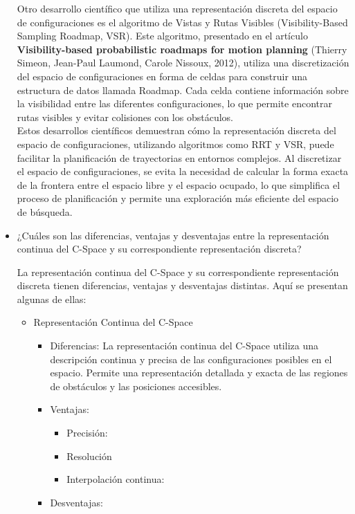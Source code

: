 \documentclass{article}
\begin{document}
\begin{itemize}
  Otro desarrollo científico que utiliza una representación discreta del espacio de configuraciones es el algoritmo de Vistas y Rutas Visibles (Visibility-Based Sampling Roadmap, VSR). Este algoritmo, presentado en el artículo \textbf{Visibility-based probabilistic roadmaps for motion planning} (Thierry Simeon, Jean-Paul Laumond, Carole Nissoux, 2012), utiliza una discretización del espacio de configuraciones en forma de celdas para construir una estructura de datos llamada Roadmap. Cada celda contiene información sobre la visibilidad entre las diferentes configuraciones, lo que permite encontrar rutas visibles y evitar colisiones con los obstáculos.\\

  Estos desarrollos científicos demuestran cómo la representación discreta del espacio de configuraciones, utilizando algoritmos como RRT y VSR, puede facilitar la planificación de trayectorias en entornos complejos. Al discretizar el espacio de configuraciones, se evita la necesidad de calcular la forma exacta de la frontera entre el espacio libre y el espacio ocupado, lo que simplifica el proceso de planificación y permite una exploración más eficiente del espacio de búsqueda.
  
\item {¿Cuáles son las diferencias, ventajas y desventajas entre la representación continua del C-Space y su correspondiente representación discreta?}

  La representación continua del C-Space y su correspondiente representación discreta tienen diferencias, ventajas y desventajas distintas. Aquí se presentan algunas de ellas:
  \begin{itemize}
  \item Representación Continua del C-Space
    \begin{itemize}
    \item Diferencias: La representación continua del C-Space utiliza una descripción continua y precisa de las configuraciones posibles en el espacio. Permite una representación detallada y exacta de las regiones de obstáculos y las posiciones accesibles.
    \item Ventajas:
      \begin{itemize}
      \item Precisión:
      \item Resolución
        \item Interpolación continua:
      \end{itemize}
    \item Desventajas:
      

\end{itemize}
\end{itemize}
\end{itemize}
\end{document}
